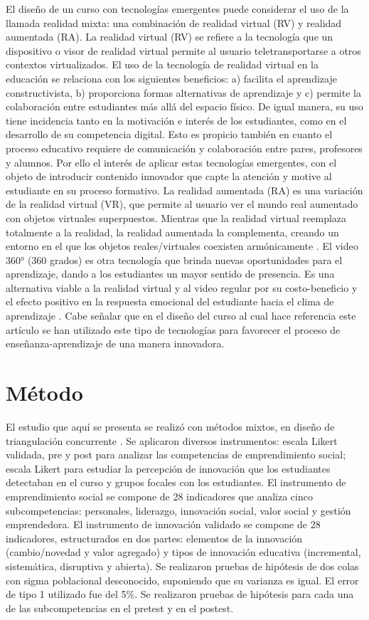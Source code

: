 \documentclass[spanish]{textolivre}
\begin{document}
El diseño de un curso con tecnologías emergentes puede considerar el uso de la llamada realidad mixta: una combinación de realidad virtual (RV) y realidad aumentada (RA). La realidad virtual (RV) se refiere a la tecnología que un dispositivo o visor de realidad virtual permite al usuario teletransportarse a otros contextos virtualizados. El uso de la tecnología de realidad virtual en la educación se relaciona con los siguientes beneficios: a) facilita el aprendizaje constructivista, b) proporciona formas alternativas de aprendizaje y c) permite la colaboración entre estudiantes más allá del espacio físico. De igual manera, su uso tiene incidencia tanto en la motivación e interés de los estudiantes, como en el desarrollo de su competencia digital. Esto es propicio también en cuanto el proceso educativo requiere de comunicación y colaboración entre pares, profesores y alumnos. Por ello el interés de aplicar estas tecnologías emergentes, con el objeto de introducir contenido innovador que capte la atención y motive al estudiante en su proceso formativo. La realidad aumentada (RA) es una variación de la realidad virtual (VR), que permite al usuario ver el mundo real aumentado con objetos virtuales superpuestos. Mientras que la realidad virtual reemplaza totalmente a la realidad, la realidad aumentada la complementa, creando un entorno en el que los objetos reales/virtuales coexisten armónicamente \cite{hernandez-de-menendez2020}. El video 360° (360 grados) es otra tecnología que brinda nuevas oportunidades para el aprendizaje, dando a los estudiantes un mayor sentido de presencia. Es una alternativa viable a la realidad virtual y al video regular por su costo-beneficio y el efecto positivo en la respuesta emocional del estudiante hacia el clima de aprendizaje \cite{ulrich2021}. Cabe señalar que en el diseño del curso al cual hace referencia este artículo se han utilizado este tipo de tecnologías para favorecer el proceso de enseñanza-aprendizaje de una manera innovadora.

\section{Método}
El estudio que aquí se presenta se realizó con métodos mixtos, en diseño de triangulación concurrente \cite{onwuegbuzie2006}. Se aplicaron diversos instrumentos: escala Likert validada, pre y post \cite{garcia-gonzalez2020} para analizar las competencias de emprendimiento social; escala Likert para estudiar la percepción de innovación que los estudiantes detectaban en el curso y grupos focales con los estudiantes. El instrumento de emprendimiento social se compone de 28 indicadores que analiza cinco subcompetencias: personales, liderazgo, innovación social, valor social y gestión emprendedora. El instrumento de innovación validado \cite{garcia-gonzalez2019} se compone de 28 indicadores, estructurados en dos partes: elementos de la innovación (cambio/novedad y valor agregado) y tipos de innovación educativa (incremental, sistemática, disruptiva y abierta). Se realizaron pruebas de hipótesis de dos colas con sigma poblacional desconocido, suponiendo que su varianza es igual. El error de tipo 1 utilizado fue del 5\%. Se realizaron pruebas de hipótesis para cada una de las subcompetencias en el pretest y en el postest.
\end{document}
